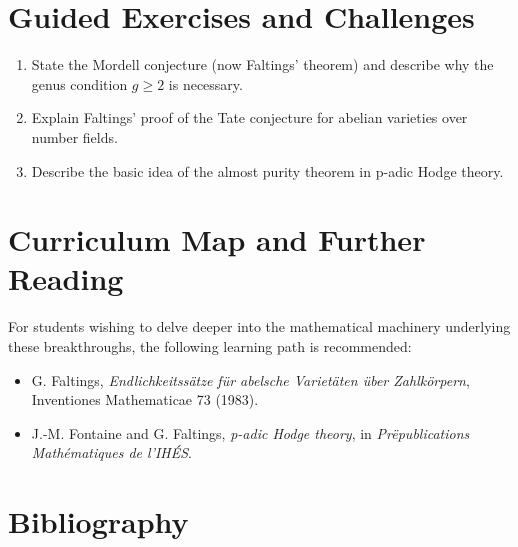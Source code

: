 \section{Guided Exercises and Challenges}
\begin{enumerate}[label=\textbf{\arabic*.}]
  \item State the Mordell conjecture (now Faltings' theorem) and describe why the genus condition $g \geq 2$ is necessary.
  \item Explain Faltings' proof of the Tate conjecture for abelian varieties over number fields.
  \item Describe the basic idea of the almost purity theorem in p-adic Hodge theory.
\end{enumerate}

\section{Curriculum Map and Further Reading}
For students wishing to delve deeper into the mathematical machinery underlying these breakthroughs, the following learning path is recommended:
\begin{itemize}
  \item G. Faltings, \emph{Endlichkeitss\"atze f\"ur abelsche Variet\"aten \"uber Zahlk\"orpern}, Inventiones Mathematicae 73 (1983).
  \item J.-M. Fontaine and G. Faltings, \emph{p-adic Hodge theory}, in \emph{Pr\"epublications Math\'ematiques de l'IH\'ES}.
\end{itemize}

\section*{Bibliography}

